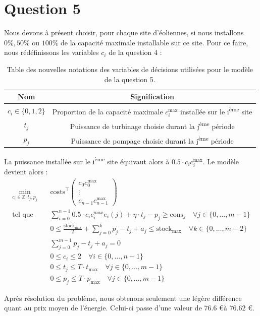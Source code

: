 \documentclass{article}
\begin{document}
\newpage
\section*{Question 5}
Nous devons à présent choisir, pour chaque site d'éoliennes, si nous installons $0\%, 50\%$ ou $100\%$ de la capacité maximale installable sur ce site.
Pour ce faire, nous rédéfinissons les variables $c_i$ de la question 4 :

\begin{table}[h!]
    \centering
    \renewcommand{\arraystretch}{1.5}%
    \begin{tabular}{|c || c |} 
        \hline
        Nom & Signification\\
        \hline\hline
        $c_{i} \in \{ 0, 1, 2 \}$ & Proportion de la capacité maximale $c_i^\mathrm{max}$ installée sur le i\textsuperscript{ème} site\\
        $t_j$ & Puissance de turbinage choisie durant la j\textsuperscript{ème} période\\
        $p_j$ & Puissance de pompage choisie durant la j\textsuperscript{ème} période\\
        \hline
    \end{tabular}
    \caption{Table des nouvelles notations des variables de décisions utilisées pour le modèle de la question 5.}
    \label{table:notations_variables_5}
\end{table} 
\noindent La puissance installée sur le i\textsuperscript{ème} site équivaut alors à $0.5 \cdot c_ic_i^\mathrm{max}$. Le modèle devient alors :
\begin{align}
    \min_{c_{i} \in \mathbb{Z},t_j,p_j} \quad &\mathrm{costs}^\intercal 
    \begin{pmatrix}
        c_0c_0^\mathrm{max}\\
        \vdots\\
        c_{n-1}c_{n-1}^\mathrm{max}
    \end{pmatrix} \nonumber\\
    \textrm{tel que} \quad & \sum_{i=0}^{n-1} 0.5 \cdot c_ic_i^{max} e_i(j) + \eta \cdot t_j - p_j \ge \mathrm{cons}_j \quad \forall j \in  \{ 0, \ldots, m-1 \}\label{eq:5_contr1}\\
    & 0 \le \frac{\mathrm{stock}_\mathrm{max}}{2}  + \sum_{j=0}^{k} p_j - t_j + a_j \le  \mathrm{stock}_\mathrm{max} \quad \forall k \in \{ 0, \ldots, m-2 \}\label{eq:5_contr2}\\
    & \sum_{j=0}^{m-1} p_j - t_j + a_j = 0 \label{eq:5_contr3}\\
    & 0\le c_i \le 2 \quad \forall i \in  \{ 0, \ldots, n-1 \} \label{eq:5_contr4}  \\
    & 0 \le t_j \le T \cdot t_\mathrm{max} \quad \forall j \in  \{ 0, \ldots, m-1 \} \label{eq:5_contr5}\\
    & 0 \le p_j \le T \cdot p_\mathrm{max} \quad \forall j \in  \{ 0, \ldots, m-1 \} \label{eq:5_contr6} 
\end{align}

\noindent Après résolution du problème, nous obtenons seulement une légère différence quant au prix moyen de l'énergie.
Celui-ci passe d'une valeur de $76.6$ \euro à $76.62$ \euro.
\end{document}
